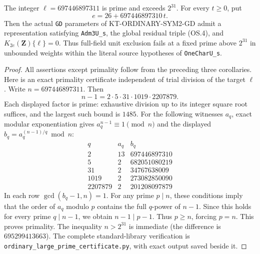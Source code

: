 \begin{corollary}
The integer $\ell=697446897311$ is prime and exceeds
$2^{31}$. For every $t\geq0$, put
\[
                  e=26+697446897310\,t.
\]
Then the actual \texttt{GD} parameters of
KT-ORDINARY-SYM2-GD admit a representation satisfying
\texttt{Adm3U\_s}, the global residual triple (OS.4),
and $K_{2e}(\mathbf Z)\{\ell\}=0$.
Thus full-field unit exclusion fails at a fixed prime
above $2^{31}$ in unbounded weights within the literal
source hypotheses of \texttt{OneCharU\_s}.
\end{corollary}
\begin{proof}
All assertions except primality follow from the preceding
three corollaries. Here is an exact primality certificate
independent of trial division of the target $\ell$.
Write $n=697446897311$. Then
\[
              n-1=2\cdot5\cdot31\cdot1019\cdot2207879.
\]
Each displayed factor is prime: exhaustive division up to
its integer square root suffices, and the largest such
bound is $1485$. For the following witnesses $a_q$, exact
modular exponentiation gives $a_q^{n-1}\equiv1\pmod n$
and the displayed $b_q=a_q^{(n-1)/q}\bmod n$:
\[
\begin{array}{r|r|r}
q&a_q&b_q\\\hline
2&13&697446897310\\
5&2&682051080219\\
31&2&34767638009\\
1019&2&273082850090\\
2207879&2&201208097879
\end{array}
\]
In each row $\gcd(b_q-1,n)=1$.
For any prime $p\mid n$, these conditions imply that the
order of $a_q$ modulo $p$ contains the full $q$-power of
$n-1$. Since this holds for every prime $q\mid n-1$,
we obtain $n-1\mid p-1$. Thus $p\geq n$, forcing $p=n$.
This proves primality. The inequality $n>2^{31}$ is
immediate (the difference is $695299413663$).
The complete standard-library verification is
\texttt{ordinary\_large\_prime\_certificate.py}, with
exact output saved beside it.
\end{proof}


